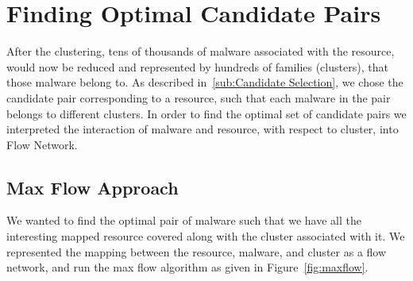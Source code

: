 \section{Finding Optimal Candidate Pairs}
\label{sec:Finding Optimal Candidate Pairs}
After the clustering, tens of thousands of malware associated with the resource, would now be reduced and represented by hundreds of families (clusters), that those malware belong to.
As described in~\autoref{sub:Candidate Selection}, we chose the candidate pair corresponding to a resource, such that each malware in the pair belongs to different clusters.
In order to find the optimal set of candidate pairs we interpreted the interaction of malware and resource, with respect to cluster, into Flow Network.
\subsection{Max Flow Approach}
\label{sub:Max Flow Approach}
We wanted to find the optimal pair of malware such that we have all the interesting mapped resource covered along with the cluster associated with it.
We represented the mapping between the resource, malware, and cluster as a flow network, and run the max flow algorithm as given in Figure~\ref{fig:maxflow}.\\


